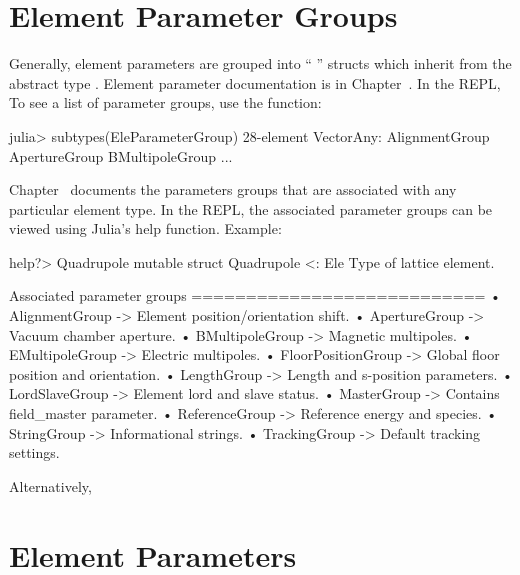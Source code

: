 \section{Element Parameter Groups}
\label{s:ele.groups}

Generally, element parameters are grouped into ``  '' 
structs which inherit from the abstract type . 
Element parameter documentation is in Chapter~. In the REPL,
To see a list of parameter groups, use the  function:
\begin{example}
  julia> subtypes(EleParameterGroup)
  28-element Vector{Any}:
   AlignmentGroup
   ApertureGroup
   BMultipoleGroup
   ...
\end{example}
Chapter~ documents the parameters groups that are associated with any particular element type.
In the REPL, the associated parameter groups can be viewed using Julia's help function. Example: 
\begin{example}
  help?> Quadrupole
    mutable struct Quadrupole <: Ele
    Type of lattice element.

    Associated parameter groups
    ===========================
      •  AlignmentGroup -> Element position/orientation shift.
      •  ApertureGroup -> Vacuum chamber aperture.
      •  BMultipoleGroup -> Magnetic multipoles.
      •  EMultipoleGroup -> Electric multipoles.
      •  FloorPositionGroup -> Global floor position and orientation.
      •  LengthGroup -> Length and s-position parameters.
      •  LordSlaveGroup -> Element lord and slave status.
      •  MasterGroup -> Contains field_master parameter.
      •  ReferenceGroup -> Reference energy and species.
      •  StringGroup -> Informational strings.
      •  TrackingGroup -> Default tracking settings.
\end{example}
Alternatively, 

\section{Element Parameters}
\label{s:ele.params}

